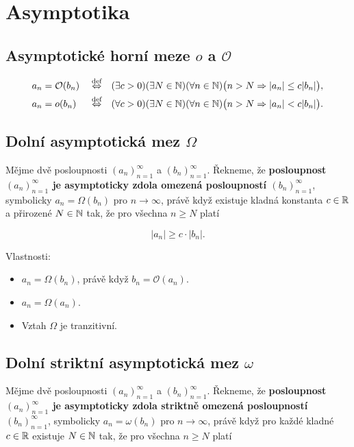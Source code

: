 \section{Asymptotika}

\subsection*{Asymptotické horní meze $o$ a $\mathcal{O}$}

\begin{align*}
    a_n & = \mathcal{O}(b_n) &  & \stackrel{\text{def}}{\Leftrightarrow} &  & (\exists c > 0)(\exists N \in \mathbb{N})(\forall n \in \mathbb{N})\big(n > N \Rightarrow |a_n| \leq c |b_n|\big), \\
    a_n & = o(b_n)           &  & \stackrel{\text{def}}{\Leftrightarrow} &  & (\forall c > 0)(\exists N \in \mathbb{N})(\forall n \in \mathbb{N})\big(n > N \Rightarrow |a_n| < c |b_n|\big).
\end{align*}

\subsection*{Dolní asymptotická mez $\Omega$}

Mějme dvě posloupnosti $(a_n)_{n=1}^\infty$ a $(b_n)_{n=1}^\infty$. Řekneme, že
\textbf{posloupnost $(a_n)_{n=1}^\infty$ je asymptoticky zdola omezená
    posloupností $(b_n)_{n=1}^\infty$}, symbolicky $a_n = \Omega(b_n)$ pro $n \to
    \infty$, právě když existuje kladná konstanta $c \in \mathbb{R}$ a přirozené $N \in \mathbb{N}$
tak, že pro všechna $n \geq N$ platí

\[ |a_n| \geq c \cdot |b_n|. \]

\noindent Vlastnosti:

\begin{itemize}
    \item $a_n = \Omega(b_n)$, právě když $b_n = \mathcal{O}(a_n)$.
    \item $a_n = \Omega(a_n)$.
    \item Vztah $\Omega$ je tranzitivní.
\end{itemize}

\subsection*{Dolní striktní asymptotická mez $\omega$}

Mějme dvě posloupnosti $(a_n)_{n=1}^\infty$ a $(b_n)_{n=1}^\infty$. Řekneme, že
\textbf{posloupnost $(a_n)_{n=1}^\infty$ je asymptoticky zdola striktně omezená
    posloupností $(b_n)_{n=1}^\infty$}, symbolicky $a_n = \omega(b_n)$ pro $n \to
    \infty$, právě když pro každé kladné $c \in \mathbb{R}$ existuje $N \in \mathbb{N}$ tak, že pro
všechna $n \geq N$ platí

